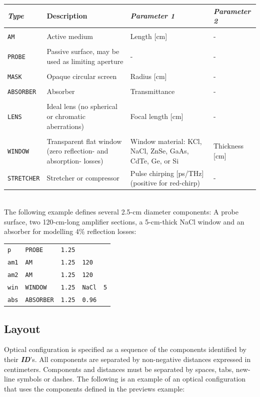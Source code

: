 \documentclass{report}
\begin{document}
\def\tabularxcolumn#1{m{#1}}
\begin{tabularx}{\textwidth}{|l|X|X|X|}
\hline 
\textit{\textbf{Type}} & Description & \textit{\textbf{Parameter 1}} & \textit{\textbf{Parameter 2}} \\
\hline 
&&&\\
\texttt{AM}	& Active medium	& Length [cm]	& - \\
&&&\\
\texttt{PROBE} & Passive surface, may be used as limiting aperture &	- &	-\\
&&&\\
\texttt{MASK} & Opaque circular screen & Radius [cm] & -\\
&&&\\
\texttt{ABSORBER} & Absorber & Transmittance & -\\
&&&\\
\texttt{LENS} & Ideal lens (no spherical or chromatic aberrations)& Focal length [cm]& -\\
&&&\\
\texttt{WINDOW} & Transparent flat window (zero reflection- and absorption- losses) & Window material: KCl, NaCl, ZnSe, GaAs, CdTe, Ge, or Si & Thickness [cm]\\

\texttt{STRETCHER} & Stretcher or compressor & Pulse chirping [ps/THz] (positive for red-chirp) & -\\
\hline
\end{tabularx}\\


The following example defines several 2.5-cm diameter components: A probe surface, two 120-cm-long amplifier sections, a 5-cm-thick NaCl window and an absorber for modelling 4\% reflection losses:

\bigskip
\begin{tabular}{lllll}
\texttt{p}   & \texttt{PROBE}    & \texttt{1.25} &               &           \\
\texttt{am1} & \texttt{AM}       & \texttt{1.25} & \texttt{120}  &           \\
\texttt{am2} & \texttt{AM}       & \texttt{1.25} & \texttt{120}  &           \\
\texttt{win} & \texttt{WINDOW}   & \texttt{1.25} & \texttt{NaCl} & \texttt{5}\\
\texttt{abs} & \texttt{ABSORBER} & \texttt{1.25} & \texttt{0.96} &
\end{tabular}

\subsection{Layout}
Optical configuration is specified as a sequence of the components identified by their \textit{\textbf{ID}}’s. All components are separated by non-negative distances expressed in centimeters. Components and distances must be separated by spaces, tabs, new-line symbols or dashes. The following is an example of an optical configuration that uses the components defined in the previews example:
\end{document}
